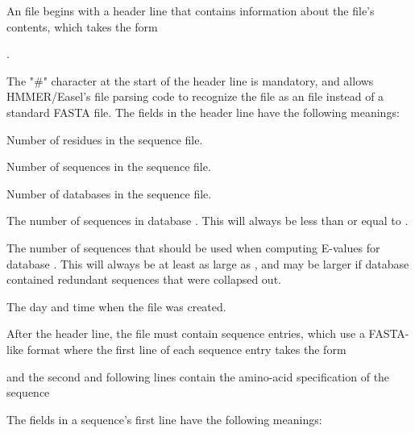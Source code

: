 \documentclass[notoc,justified]{tufte-book}    %
\begin{document}
An  file begins with a header line that contains information about the file's contents, which takes the form 

.

The "\#" character at the start of the header line is mandatory, and allows HMMER/Easel's file parsing code to recognize the file as an  file instead of a standard FASTA file.  The fields in the header line have the following meanings:

\begin{sreitems}{}

\item [\monob{res\_cnt}] Number of residues in the sequence file.

\item [\monob{seq\_cnt}] Number of sequences in the sequence file. 

\item [\monob{db\_cnt}] Number of databases in the sequence file. 

\item [\monob{cnt\_i}] The number of sequences in database . This will always be less than or equal to .
 
\item [\monob{fullcnt\_i}] The number of sequences that should be used when computing E-values for database .  This will always be at least as large as , and may be larger if database  contained redundant sequences that were collapsed out.

\item [\monob{date\_stamp}] The day and time when the file was created.
\end{sreitems}

After the header line, the file must contain  sequence entries, which use a FASTA-like format where the first line of each sequence entry takes the form 


and the second and following lines contain the amino-acid specification of the sequence  

The fields in a sequence's first line have the following meanings:
\end{document}
